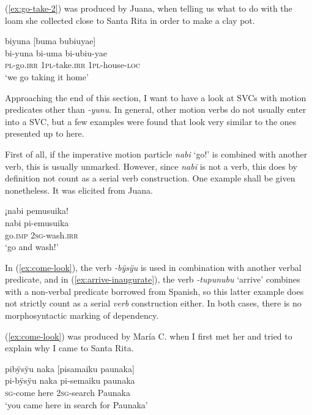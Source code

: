 (\ref{ex:go-take-2}) was produced by Juana, when telling us what to do with the loam she collected close to Santa Rita in order to make a clay pot.

\ea\label{ex:go-take-2}
\begingl
\glpreamble biyuna \textup{[}buma bubiuyae\textup{]}\\
\gla bi-yuna bi-uma bi-ubiu-yae\\
\textsc{pl}-go.\textsc{irr} 1\textsc{pl}-take.\textsc{irr} 1\textsc{pl}-house-\textsc{loc}\\
\glft ‘we go taking it home’
\endgl
\trailingcitation{[jmx-d110918ls-2.04]}
\xe

Approaching the end of this section, I want to have a look at SVCs with motion predicates other than \textit{-yunu}. In general, other motion verbs do not usually enter into a SVC, but a few examples were found that look very similar to the ones presented up to here.

First of all, if the imperative motion particle \textit{nabi} ‘go!’ is combined with another verb, this is usually unmarked. However, since \textit{nabi} is not a verb, this does by definition not count as a serial verb construction. One example shall be given nonetheless. It was elicited from Juana.

\ea\label{ex:SVC-nabi}
\begingl
\glpreamble ¡nabi pemusuika!\\
\gla nabi pi-emusuika\\
\glb go.\textsc{imp} 2\textsc{sg}-wash.\textsc{irr}\\
\glft ‘go and wash!’
\endgl
\trailingcitation{[jxx-e190210s-01]}
\xe

In (\ref{ex:come-look}), the verb \textit{-bÿsÿu} is used in combination with another verbal predicate, and in (\ref{ex:arrive-inaugurate}), the verb \textit{-tupunubu} ‘arrive’ combines with a non-verbal predicate borrowed from Spanish, so this latter example does not strictly count as a serial \textit{verb} construction either. In both cases, there is no morphosyntactic marking of dependency.

(\ref{ex:come-look}) was produced by María C. when I first met her and tried to explain why I came to Santa Rita.

\ea\label{ex:come-look}
\begingl
\glpreamble pibÿsÿu naka \textup{[}pisamaiku paunaka\textup{]}\\
\gla pi-bÿsÿu naka pi-semaiku paunaka\\
\textsc{sg}-come here 2\textsc{sg}-search Paunaka\\
\glft ‘you came here in search for Paunaka’
\endgl
\trailingcitation{[uxx-p110825l.028]}
\xe

